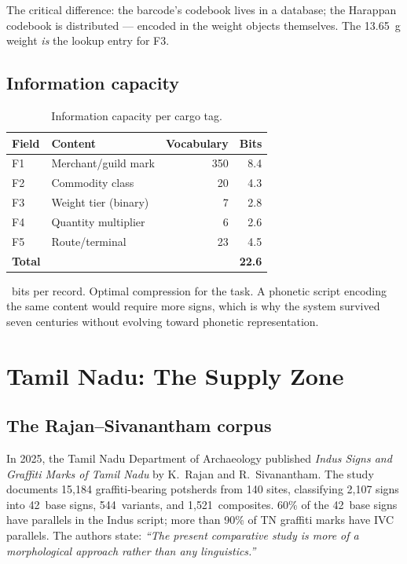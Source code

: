 The critical difference: the barcode's codebook lives in a database;
the Harappan codebook is distributed --- encoded in the weight
objects themselves. The \SI{13.65}{\gram} weight \emph{is} the
lookup entry for F3.

\subsection{Information capacity}

\begin{longtable}{@{}llrr@{}}
\caption{Information capacity per cargo tag.}
\label{tab:bits}\\
\toprule
Field & Content & Vocabulary & Bits \\
\midrule
\endfirsthead
\bottomrule
\endlastfoot
F1 & Merchant/guild mark & \num{350} & \num{8.4} \\
\midrule
F2 & Commodity class & \num{20} & \num{4.3} \\
\midrule
F3 & Weight tier (binary) & \num{7} & \num{2.8} \\
\midrule
F4 & Quantity multiplier & \num{6} & \num{2.6} \\
\midrule
F5 & Route/terminal & \num{23} & \num{4.5} \\
\midrule
\textbf{Total} & & & \textbf{\num{22.6}} \\
\end{longtable}

~bits per record. Optimal compression for the task.
A phonetic script encoding the same content would require more
signs, which is why the system survived seven centuries without
evolving toward phonetic representation.

\section{Tamil Nadu: The Supply Zone}

\subsection{The Rajan--Sivanantham corpus}

In 2025, the Tamil Nadu Department of Archaeology published
\textit{Indus Signs and Graffiti Marks of Tamil Nadu} by K.\ Rajan
and R.\ Sivanantham.\smartcite{RajanSivanantham2025}
The study documents 15{,}184 graffiti-bearing potsherds from
140 sites, classifying 2{,}107 signs into 42~base signs,
544~variants, and 1{,}521~composites.
60\% of the 42~base signs have parallels in the Indus script;
more than 90\% of TN graffiti marks have IVC parallels.
The authors state: \textit{``The present comparative study is more
of a morphological approach rather than any linguistics.''}

